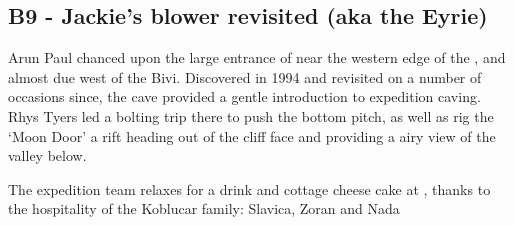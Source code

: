\subsection{B9 - Jackie's blower revisited (aka the Eyrie)}
Arun Paul chanced upon the large entrance of  near the western edge of the , and almost due west of the Bivi. Discovered in 1994 and revisited on a number of occasions since, the cave provided a gentle introduction to expedition caving. Rhys Tyers led a bolting trip there to push the bottom pitch, as well as rig the `Moon Door' a rift heading out of the cliff face and providing a airy view of the  valley below.

 

\begin{pagefigure}
\checkoddpage \ifoddpage \forcerectofloat \else \forceversofloat \fi
\centering
{}
\caption{The expedition team relaxes for a drink and cottage cheese cake at , thanks to the hospitality of the Koblucar family: Slavica, Zoran and Nada }
\label{End of the expedition}
\end{pagefigure}

